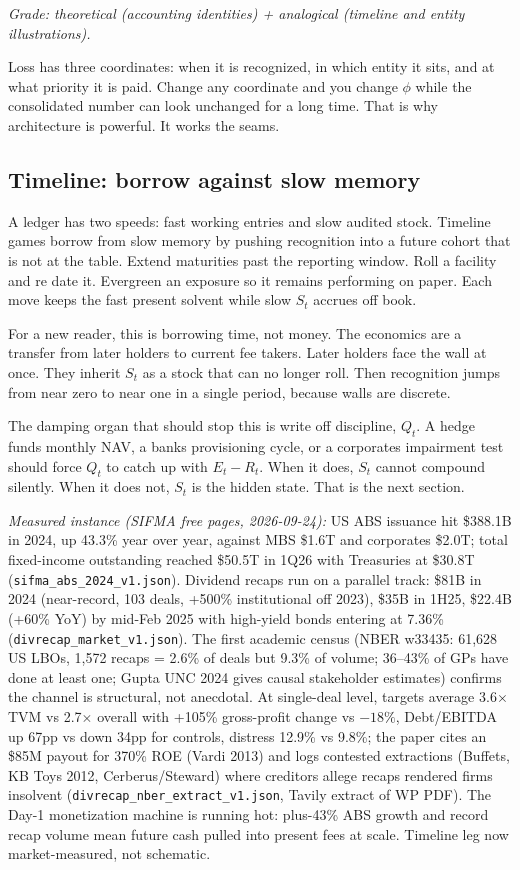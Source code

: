 \documentclass[11pt]{article}
\begin{document}
\textit{Grade: theoretical (accounting identities) + analogical (timeline and entity illustrations).}

Loss has three coordinates: when it is recognized, in which entity it sits, and at what priority it is paid. Change any coordinate and you change $\phi$ while the consolidated number can look unchanged for a long time. That is why architecture is powerful. It works the seams.

\subsection{Timeline: borrow against slow memory}

A ledger has two speeds: fast working entries and slow audited stock. Timeline games borrow from slow memory by pushing recognition into a future cohort that is not at the table. Extend maturities past the reporting window. Roll a facility and re date it. Evergreen an exposure so it remains performing on paper. Each move keeps the fast present solvent while slow $S_t$ accrues off book.

For a new reader, this is borrowing time, not money. The economics are a transfer from later holders to current fee takers. Later holders face the wall at once. They inherit $S_t$ as a stock that can no longer roll. Then recognition jumps from near zero to near one in a single period, because walls are discrete.

The damping organ that should stop this is write off discipline, $Q_t$. A hedge funds monthly NAV, a banks provisioning cycle, or a corporates impairment test should force $Q_t$ to catch up with $E_t - R_t$. When it does, $S_t$ cannot compound silently. When it does not, $S_t$ is the hidden state. That is the next section.

\textit{Measured instance (SIFMA free pages, 2026-09-24):} US ABS issuance hit \$388.1B in 2024, up 43.3\% year over year, against MBS \$1.6T and corporates \$2.0T; total fixed-income outstanding reached \$50.5T in 1Q26 with Treasuries at \$30.8T (\texttt{sifma\_abs\_2024\_v1.json}). Dividend recaps run on a parallel track: \$81B in 2024 (near-record, 103 deals, +500\% institutional off 2023), \$35B in 1H25, \$22.4B (+60\% YoY) by mid-Feb 2025 with high-yield bonds entering at 7.36\% (\texttt{divrecap\_market\_v1.json}). The first academic census (NBER w33435: 61,628 US LBOs, 1,572 recaps = 2.6\% of deals but 9.3\% of volume; 36--43\% of GPs have done at least one; Gupta UNC 2024 gives causal stakeholder estimates) confirms the channel is structural, not anecdotal. At single-deal level, targets average 3.6$\times$ TVM vs 2.7$\times$ overall with +105\% gross-profit change vs $-18\%$, Debt/EBITDA up 67pp vs down 34pp for controls, distress 12.9\% vs 9.8\%; the paper cites an \$85M payout for 370\% ROE (Vardi 2013) and logs contested extractions (Buffets, KB Toys 2012, Cerberus/Steward) where creditors allege recaps rendered firms insolvent (\texttt{divrecap\_nber\_extract\_v1.json}, Tavily extract of WP PDF). The Day-1 monetization machine is running hot: plus-43\% ABS growth and record recap volume mean future cash pulled into present fees at scale. Timeline leg now market-measured, not schematic.
\end{document}
